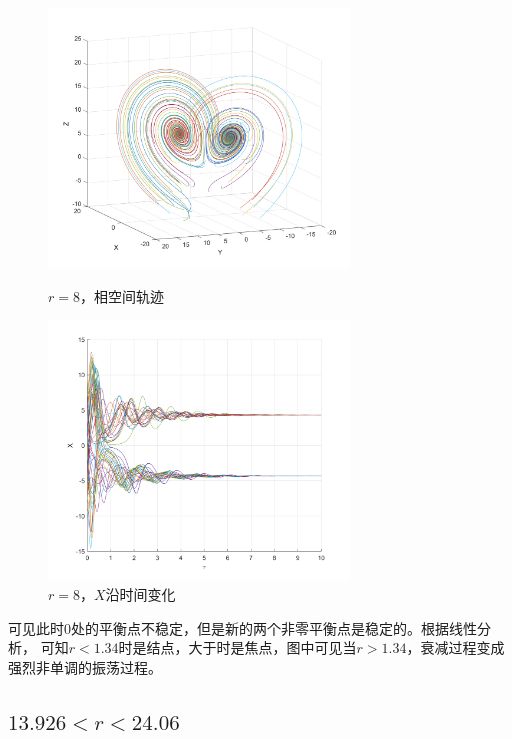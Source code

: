 \documentclass[UTF8,zihao=5]{ctexart} %
\begin{document}
\begin{figure}[H]
    \begin{minipage}[c]{0.45\linewidth}  %
        \centering
        \includegraphics[width=8cm]{XYZ_r_8.png}  %
        \caption{$r=8$，相空间轨迹}
    \end{minipage}
    \hfill %
    \begin{minipage}[c]{0.45\linewidth}  %
        \centering
        \includegraphics[width=8cm]{XT_r_8.png}  %
        \caption{$r=8$，$X$沿时间变化}
    \end{minipage}
\end{figure}
可见此时0处的平衡点不稳定，但是新的两个非零平衡点是稳定的。根据线性分析，
可知$r<1.34$时是结点，大于时是焦点，图中可见当$r>1.34$，衰减过程变成强烈非单调的振荡过程。

\subsection{$13.926<r<24.06$}
\end{document}
